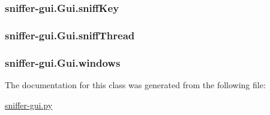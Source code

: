 \hypertarget{classsniffer-gui_1_1Gui_a02d82ddd2bd64b83f833b7a006e39fea}{
\subsubsection[{sniff\-Key}]{\setlength{\rightskip}{0pt plus 5cm}sniffer-\/gui.\-Gui.\-sniff\-Key}}\label{classsniffer-gui_1_1Gui_a02d82ddd2bd64b83f833b7a006e39fea}
\hypertarget{classsniffer-gui_1_1Gui_a91a2407e461004ac2c2d35e6fc7fb2a9}{
\subsubsection[{sniff\-Thread}]{\setlength{\rightskip}{0pt plus 5cm}sniffer-\/gui.\-Gui.\-sniff\-Thread}}\label{classsniffer-gui_1_1Gui_a91a2407e461004ac2c2d35e6fc7fb2a9}
\hypertarget{classsniffer-gui_1_1Gui_a2846e2b9d520f6b0a3e988d713032d6f}{
\subsubsection[{windows}]{\setlength{\rightskip}{0pt plus 5cm}sniffer-\/gui.\-Gui.\-windows}}\label{classsniffer-gui_1_1Gui_a2846e2b9d520f6b0a3e988d713032d6f}


The documentation for this class was generated from the following file\-:\begin{DoxyCompactItemize}
\item 
\hyperlink{sniffer-gui_8py}{sniffer-\/gui.\-py}\end{DoxyCompactItemize}

